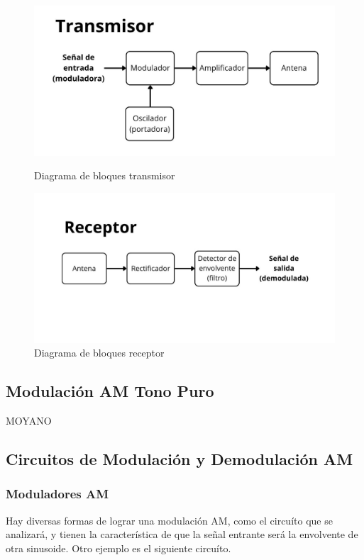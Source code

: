 \begin{figure}[ht!]
    \centering
    \begin{minipage}{0.48\linewidth}
        \centering
        \includegraphics[width=0.95\linewidth]{img/transmisor.jpg}
        \caption{Diagrama de bloques transmisor}
        \label{fig:bloques_transmisor}
    \end{minipage}\hfill
    \begin{minipage}{0.48\linewidth}
        \centering
        \includegraphics[width=0.95\linewidth]{img/receptor.jpg}
        \caption{Diagrama de bloques receptor}
        \label{fig:bloques_receptor}
    \end{minipage}
\end{figure}

\subsection{Modulación AM Tono Puro}

MOYANO

\subsection{Circuitos de Modulación y Demodulación AM}

\subsubsection{Moduladores AM}
Hay diversas formas de lograr una modulación AM, como el circuíto que se analizará, y tienen la característica de que la señal entrante será la envolvente de otra sinusoide. Otro ejemplo es el siguiente circuíto.

